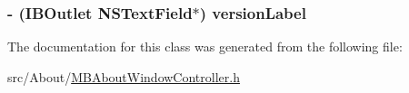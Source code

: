 \hypertarget{interface_m_b_about_window_controller_a3a54f9ecab2548f2f6647ffd8af3b1f9}{
\subsubsection[{version\-Label}]{\setlength{\rightskip}{0pt plus 5cm}-\/ (I\-B\-Outlet N\-S\-Text\-Field$\ast$) version\-Label\hspace{0.3cm}{\ttfamily [protected]}}}\label{interface_m_b_about_window_controller_a3a54f9ecab2548f2f6647ffd8af3b1f9}


The documentation for this class was generated from the following file\-:\begin{DoxyCompactItemize}
\item 
src/\-About/\hyperlink{_m_b_about_window_controller_8h}{M\-B\-About\-Window\-Controller.\-h}\end{DoxyCompactItemize}
